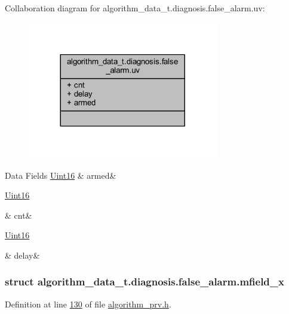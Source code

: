 Collaboration diagram for algorithm\+\_\+data\+\_\+t.\+diagnosis.\+false\+\_\+alarm.\+uv\+:\nopagebreak
\begin{figure}[H]
\begin{center}
\leavevmode
\includegraphics[width=236pt]{d9/db0/a00900}
\end{center}
\end{figure}
\begin{DoxyFields}{Data Fields}
\hypertarget{a00016_a6e0c631e86ef2402cfa1ca3608a5123e}{\hyperlink{a00072_a59a9f6be4562c327cbfb4f7e8e18f08b}{Uint16}}\label{a00016_a6e0c631e86ef2402cfa1ca3608a5123e}
&
armed&
\\
\hline

\hypertarget{a00016_a2817f701d5e1a1181e657251363295fd}{\hyperlink{a00072_a59a9f6be4562c327cbfb4f7e8e18f08b}{Uint16}}\label{a00016_a2817f701d5e1a1181e657251363295fd}
&
cnt&
\\
\hline

\hypertarget{a00016_a7243f8be75253afbadf7477867021f8b}{\hyperlink{a00072_a59a9f6be4562c327cbfb4f7e8e18f08b}{Uint16}}\label{a00016_a7243f8be75253afbadf7477867021f8b}
&
delay&
\\
\hline

\end{DoxyFields}
\label{d4/d3a/a00101}
\hypertarget{a00016_d4/d3a/a00101}{}
\subsubsection{struct algorithm\+\_\+data\+\_\+t.\+diagnosis.\+false\+\_\+alarm.\+mfield\+\_\+x}


Definition at line \hyperlink{a00016_source_l00130}{130} of file \hyperlink{a00016_source}{algorithm\+\_\+prv.\+h}.



